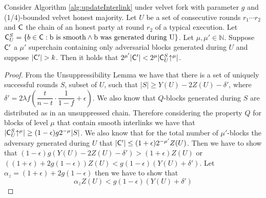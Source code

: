\begin{lemma}
   Consider Algorithm \ref{alg:updateInterlink} under velvet fork with parameter $g$ and (1/4)-bounded velvet honest majority. Let $U$ be a set of consecutive rounds $r_1 \cdots r_2$ and $\mathsf{C}$ the chain of an honest party at round $r_2$ of a typical execution. Let $\mathsf{C}^S_U = \{b \in \mathsf{C}: \text{b is smooth} \wedge \text{b was generated during U} \}$. Let $\mu, \mu' \in \mathbb{N}$. Suppose $\mathsf{C}'$ a $\mu'$ superchain containing only adversarial blocks generated during $U$ and suppose $\lvert \mathsf{C}' \rvert > k$. Then it holds that $ 2^{\mu'}\lvert \mathsf{C}' \rvert < 2^{\mu}\lvert \mathsf{C}^S_U\negthickspace\uparrow^{\mu} \rvert $.
   \label{lem:claim3_lemma}
\end{lemma}
\begin{proof} From the Unsuppressibility Lemma we have that there is a set of uniquely successful rounds $S$, subset of $U$, such that $\lvert S \rvert \geq Y(U) - 2Z(U) - \delta'$, where $\delta' = 2 \lambda f (\dfrac{t}{n-t} \cdot \dfrac{1}{1-f} + \epsilon)$. We also know that $Q$-blocks generated during $S$ are distributed as in an unsuppressed chain. Therefore considering the property $Q$ for blocks of level $\mu$ that contain smooth interlinks we have that  $\lvert \mathsf{C}^S_U\negthickspace\uparrow^{\mu} \rvert \geq (1-\epsilon)g2^{-\mu} \lvert S \rvert$. We also know that for the total number of $\mu'$-blocks the adversary generated during $U$ that $\lvert \mathsf{C}' \rvert \leq (1+\epsilon)2^{-\mu'}Z(U)$. Then we have to show that $(1-\epsilon)g (Y(U) - 2Z(U) - \delta' ) > (1+\epsilon)Z(U)$ or $((1+\epsilon)+2g(1-\epsilon))Z(U) < g(1-\epsilon)(Y(U) + \delta')$. Let $\alpha_z = (1+\epsilon)+2g(1-\epsilon)$ then we have to show that \begin{equation}\label{eq:lemma_eq1} \alpha_z Z(U) < g(1-\epsilon)(Y(U) + \delta') \end{equation}


\end{proof}
